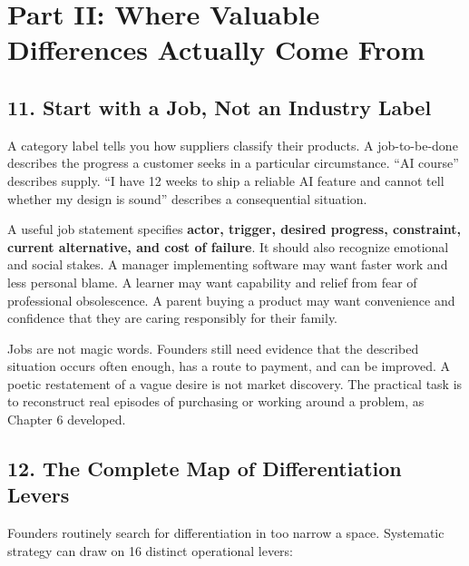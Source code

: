 \section*{Part II: Where Valuable Differences Actually Come From}

\subsection*{11. Start with a Job, Not an Industry Label}

A category label tells you how suppliers classify their products. A job-to-be-done describes the progress a customer seeks in a particular circumstance. ``AI course'' describes supply. ``I have 12 weeks to ship a reliable AI feature and cannot tell whether my design is sound'' describes a consequential situation.

A useful job statement specifies \textbf{actor, trigger, desired progress, constraint, current alternative, and cost of failure}. It should also recognize emotional and social stakes. A manager implementing software may want faster work and less personal blame. A learner may want capability and relief from fear of professional obsolescence. A parent buying a product may want convenience and confidence that they are caring responsibly for their family.

Jobs are not magic words. Founders still need evidence that the described situation occurs often enough, has a route to payment, and can be improved. A poetic restatement of a vague desire is not market discovery. The practical task is to reconstruct real episodes of purchasing or working around a problem, as Chapter 6 developed.

\subsection*{12. The Complete Map of Differentiation Levers}

Founders routinely search for differentiation in too narrow a space. Systematic strategy can draw on 16 distinct operational levers:

